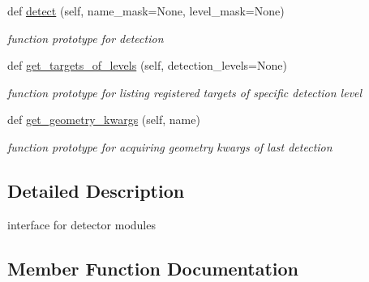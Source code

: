 \begin{DoxyCompactItemize}
def \hyperlink{classrnb-planning_1_1src_1_1pkg_1_1detector_1_1detector__interface_1_1_detector_interface_a734acaa6b5ec9d536a7dbc9479f36c4d}{detect} (self, name\+\_\+mask=None, level\+\_\+mask=None)
\begin{DoxyCompactList}\small\item\em function prototype for detection \end{DoxyCompactList}\item 
def \hyperlink{classrnb-planning_1_1src_1_1pkg_1_1detector_1_1detector__interface_1_1_detector_interface_aca91ec41e0e87dcca165c6eb10806357}{get\+\_\+targets\+\_\+of\+\_\+levels} (self, detection\+\_\+levels=None)
\begin{DoxyCompactList}\small\item\em function prototype for listing registered targets of specific detection level \end{DoxyCompactList}\item 
def \hyperlink{classrnb-planning_1_1src_1_1pkg_1_1detector_1_1detector__interface_1_1_detector_interface_a3b19e0401a73d9f0a9364efbeeaca638}{get\+\_\+geometry\+\_\+kwargs} (self, name)
\begin{DoxyCompactList}\small\item\em function prototype for acquiring geometry kwargs of last detection \end{DoxyCompactList}\end{DoxyCompactItemize}


\subsection{Detailed Description}
interface for detector modules 

\subsection{Member Function Documentation}
\mbox{\label{classrnb-planning_1_1src_1_1pkg_1_1detector_1_1detector__interface_1_1_detector_interface_a734acaa6b5ec9d536a7dbc9479f36c4d}} 
